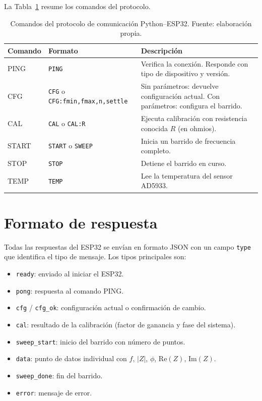 \documentclass[11pt,a4paper,spanish]{book}
\begin{document}
La Tabla~\ref{tab:comandos} resume los comandos del protocolo.

\begin{table}[h]
	\centering
	\begin{tabular}{l l p{6.5cm}}
		\hline\hline
		Comando & Formato & Descripci\'{o}n \\ [0.5ex]
		\hline
		PING  & \texttt{PING} & Verifica la conexi\'{o}n. Responde con tipo de dispositivo y versi\'{o}n. \\
		CFG   & \texttt{CFG} o \texttt{CFG:fmin,fmax,n,settle} & Sin par\'{a}metros: devuelve configuraci\'{o}n actual. Con par\'{a}metros: configura el barrido. \\
		CAL   & \texttt{CAL} o \texttt{CAL:R} & Ejecuta calibraci\'{o}n con resistencia conocida $R$ (en ohmios). \\
		START & \texttt{START} o \texttt{SWEEP} & Inicia un barrido de frecuencia completo. \\
		STOP  & \texttt{STOP} & Detiene el barrido en curso. \\
		TEMP  & \texttt{TEMP} & Lee la temperatura del sensor AD5933. \\
		\hline
	\end{tabular}
	\caption[Comandos del protocolo]{Comandos del protocolo de comunicaci\'{o}n Python--ESP32. Fuente: elaboraci\'{o}n propia.}
	\label{tab:comandos}
\end{table}

\section{Formato de respuesta}

Todas las respuestas del ESP32 se env\'{i}an en formato JSON con un campo \texttt{type} que identifica el tipo de mensaje. Los tipos principales son:

\begin{itemize}
	\item \texttt{ready}: enviado al iniciar el ESP32.
	\item \texttt{pong}: respuesta al comando PING.
	\item \texttt{cfg} / \texttt{cfg\_ok}: configuraci\'{o}n actual o confirmaci\'{o}n de cambio.
	\item \texttt{cal}: resultado de la calibraci\'{o}n (factor de ganancia y fase del sistema).
	\item \texttt{sweep\_start}: inicio del barrido con n\'{u}mero de puntos.
	\item \texttt{data}: punto de datos individual con $f$, $|Z|$, $\phi$, $\mathrm{Re}(Z)$, $\mathrm{Im}(Z)$.
	\item \texttt{sweep\_done}: fin del barrido.
	\item \texttt{error}: mensaje de error.
\end{itemize}
\end{document}
